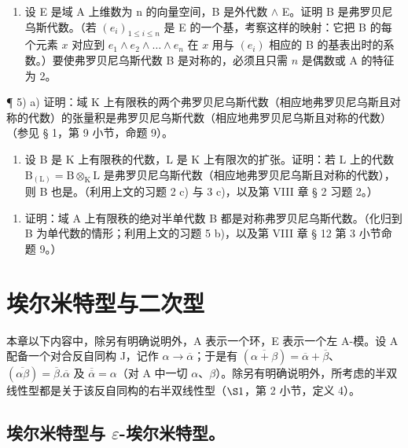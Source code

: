 \begin{enumerate}
\def\labelenumi{\alph{enumi})}
\setcounter{enumi}{1}
\tightlist
\item
  设 E 是域 A 上维数为 n 的向量空间，B 是外代数 \(\wedge\) E。证明 B 是弗罗贝尼乌斯代数。（若 \((e_i)_{1 \leqslant i \leqslant n}\) 是 E 的一个基，考察这样的映射：它把 B 的每个元素 \(x\) 对应到 \(e_1 \wedge e_2 \wedge \ldots \wedge e_n\) 在 \(x\) 用与 \((e_i)\) 相应的 B 的基表出时的系数。）要使弗罗贝尼乌斯代数 B 是对称的，必须且只需 \(n\) 是偶数或 A 的特征为 2。
\end{enumerate}

¶ 5) a) 证明：域 K 上有限秩的两个弗罗贝尼乌斯代数（相应地弗罗贝尼乌斯且对称的代数）的张量积是弗罗贝尼乌斯代数（相应地弗罗贝尼乌斯且对称的代数）（参见 § 1，第 9 小节，命题 9）。

\begin{enumerate}
\def\labelenumi{\alph{enumi})}
\setcounter{enumi}{1}
\tightlist
\item
  设 B 是 K 上有限秩的代数，L 是 K 上有限次的扩张。证明：若 L 上的代数 \(\mathrm{B}_{(\mathrm{L})} = \mathrm{B} \otimes_{\mathrm{K}} \mathrm{L}\) 是弗罗贝尼乌斯代数（相应地弗罗贝尼乌斯且对称的代数），则 B 也是。（利用上文的习题 2 c) 与 3 c)，以及第 VIII 章 § 2 习题 2。）
\end{enumerate}

\begin{enumerate}
\def\labelenumi{\arabic{enumi})}
\setcounter{enumi}{5}
\tightlist
\item
  证明：域 A 上有限秩的绝对半单代数 B 都是对称弗罗贝尼乌斯代数。（化归到 B 为单代数的情形；利用上文的习题 5 b)，以及第 VIII 章 § 12 第 3 小节命题 9。）
\end{enumerate}

\section{埃尔米特型与二次型}

本章以下内容中，除另有明确说明外，A 表示一个环，E 表示一个左 A-模。设 A 配备一个对合反自同构 J，记作 \(\alpha \to \overline{\alpha}\)；于是有 \((\overline{\alpha + \beta}) = \overline{\alpha} + \overline{\beta}\)、\((\overline{\alpha\beta}) = \overline{\beta}.\overline{\alpha}\) 及 \(\overline{\overline{\alpha}} = \alpha\)（对 A 中一切 \(\alpha\)、\(\beta\)）。除另有明确说明外，所考虑的半双线性型都是关于该反自同构的右半双线性型（\(\S 1\)，第 2 小节，定义 4）。

\subsection{\texorpdfstring{埃尔米特型与 \(\varepsilon\)-埃尔米特型。}{埃尔米特型与 epsilon-埃尔米特型。}}


